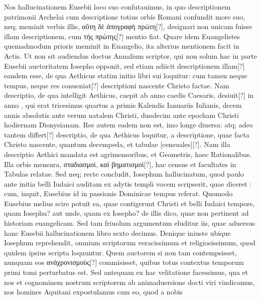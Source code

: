 Nos hallucinationem
Eusebii loco suo confutauimus, in quo descriptionem patrimonii
Archelai cum descriptione totius orbis Romani confundit more
suo, neq; meminit verbis illis, \textgreek{αὕτη δὲ ἀπογραφὴ πρώτη[?]},
 designari non
unicam fuisse illam descriptionem, cum \textgreek{τὴς πρώτης[?]} mentio fiat.
Quare
idem Euangelistes quemadmodum prioris meminit in Euangelio,
ita alterius mentionem facit in Actis.
Ut non sit audiendus doctus Annalium
scriptor, qui non solum hac in parte Eusebii auctoritatem
Iosepho opponit, sed etiam adiicit descriptionem illam[?] eandem esse,
de qua Aethicus statim initio libri sui loquitur: cum tamen neque
tempus, neque res conueniat[?] descriptioni nascente Christo factae.
Nam descriptio, de qua intelligit Aethicus, caepit ab anno caedis
Caesaris, desiuit[?] in anno ,
 qui erat tricesimus quartus a primis
Kalendis Ianuariis Iulianis, decem annis absolutis ante verum
natalem Christi, duodecim ante epocham Christi hodiernam Dionysianam.
Res autem eadem non est, imo longe diuersa: atq; adeo
tantem differt[?] descriptio, de qua Aethicus loquitur, a descriptione,
quae facta Christo nascente, quantum decempeda, et tabulae [censuales][?].
Nam illa descriptio Aethici mandata est agrimensoribus, et
Geometris, haec Rationalibus.
Illa orbis mensura, \textgreek{σταδιασμοὶ, καὶ βηματισμοὶ[?]},
hac census et facultates in Tabulas relatae.
Sed neq; recte concludit,
Iosephum hallucinatum, quod paulo ante initia belli Iudaici
auditam ex adytis templi vocem scripserit, quae diceret : cum, inquit, Eusebius id in passionis Dominicae tempus
referat.
Quomodo Eusebius melius scire potuit ea, quae contigerunt
Christi et belli Iudaici tempore, quam Iosephu? aut unde,
quam ex Iosepho? de illis dico, quae non pertinent ad historiam euangelicam.
Sed tam friuolum argumentum eluditur iis, quae aduersus
hanc Eusebii hallucinationem libro sexto decimus.
%
Denique iniuste
ubique Iosephum reprehendit, omnium scriptorum veracissimum
et religiosissimum, quod quidem ipsius scripta loquuntur.
Quem
auctorem si non tam contempsisset, nunquam eos
 \textgreek{ανἀχρονισμοὺς}[?]
 commisisset,
quibus totus contextus temporum primi tomi perturbatus
est.
Sed antequam ex hac velitatione facessimus, qua et nos et cognominem
nostrum scriptorem ab animaduersione docti viri vindicamus,
nos homines Aquitani expostulamus cum eo, quod a nobis
